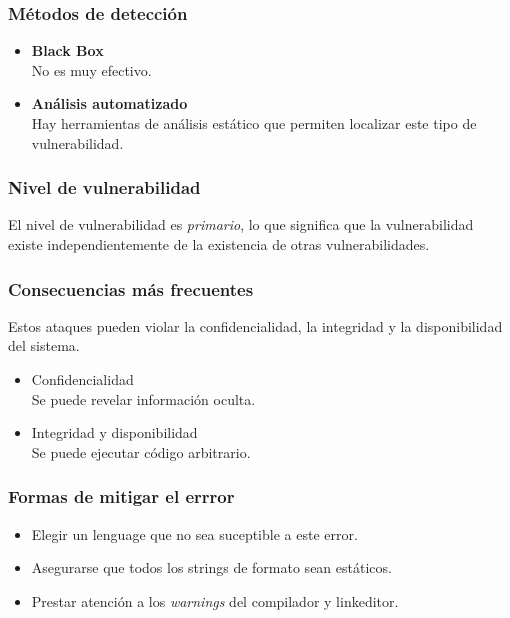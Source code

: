 \subsubsection{Métodos de detección}
\begin{itemize}
 \item \textbf{Black Box}\\
 	No es muy efectivo.
  \item \textbf{Análisis automatizado}\\
  	Hay herramientas de análisis estático que permiten localizar este tipo de vulnerabilidad.
\end{itemize}

\subsubsection{Nivel de vulnerabilidad}

El nivel de vulnerabilidad es \textit{primario}, lo que significa que la vulnerabilidad existe independientemente de la existencia de otras vulnerabilidades.


\subsubsection{Consecuencias más frecuentes}

Estos ataques pueden violar la confidencialidad, la integridad y la disponibilidad del sistema.

\begin{itemize}
 \item Confidencialidad\\
    Se puede revelar información oculta.
 \item Integridad y disponibilidad\\ 
    Se puede ejecutar código arbitrario.
\end{itemize}

\subsubsection{Formas de mitigar el errror}

\begin{itemize}

	\item Elegir un lenguage que no sea suceptible a este error.

	\item Asegurarse que todos los strings de formato sean estáticos.

	\item Prestar atención a los \textit{warnings} del compilador y linkeditor.

\end{itemize}


